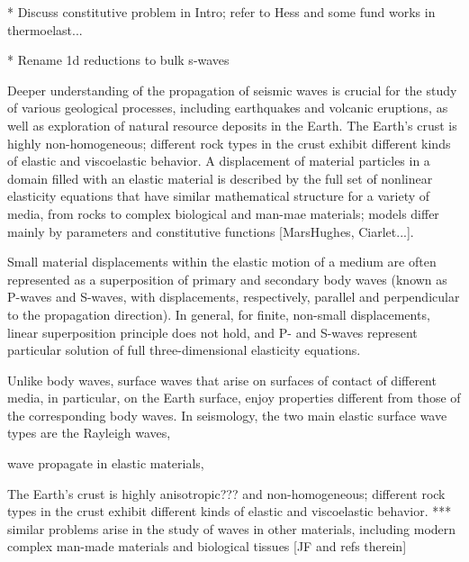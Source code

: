 \documentclass[11pt,letter,subeqn,fleqn]{article}
\numberwithin{equation}{section}
\numberwithin{table}{section}
\numberwithin{figure}{section}
\begin{document}
* Discuss constitutive problem in Intro; refer to Hess and some fund works in thermoelast...

* Rename 1d reductions to bulk s-waves



Deeper understanding of the propagation of seismic waves is crucial for the study of various geological processes, including earthquakes and volcanic eruptions, as well as exploration of natural resource deposits in the Earth. The Earth's crust is highly non-homogeneous; different rock types in the crust exhibit different kinds of elastic and viscoelastic behavior. A displacement of material particles in a domain filled with an elastic material is described by the full set of nonlinear elasticity equations that have similar mathematical structure for a variety of media, from rocks to complex biological and man-mae materials; models differ mainly by parameters and constitutive functions [MarsHughes, Ciarlet...].

Small material displacements within the elastic motion of a medium are often represented as a superposition of primary and secondary body waves (known as P-waves and S-waves, with displacements, respectively, parallel and perpendicular to the propagation direction). In general, for finite, non-small displacements, linear superposition principle does not hold, and P- and S-waves represent particular solution of full three-dimensional elasticity equations.

Unlike body waves, surface waves that arise on surfaces of contact of different media, in particular, on the Earth surface, enjoy properties different from those of the corresponding body waves. In seismology, the two main elastic surface wave types are the Rayleigh waves,


wave
propagate in elastic materials,


The Earth's crust is highly anisotropic??? and non-homogeneous; different rock types in the crust exhibit different kinds of elastic and viscoelastic behavior. *** similar problems arise in the study of waves in other materials, including modern complex man-made materials and biological tissues [JF and refs therein]
\end{document}

